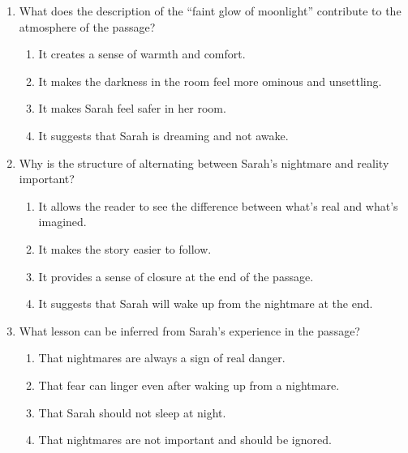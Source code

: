 \documentclass[12pt]{article}
\begin{document}
\begin{enumerate}
    \item What does the description of the “faint glow of moonlight” contribute to the atmosphere of the passage?
    \begin{enumerate}[label=\Alph*.]
        \item It creates a sense of warmth and comfort.
        \item It makes the darkness in the room feel more ominous and unsettling.
        \item It makes Sarah feel safer in her room.
        \item It suggests that Sarah is dreaming and not awake.
    \end{enumerate}
    \vspace{0.5cm}

    \item Why is the structure of alternating between Sarah’s nightmare and reality important?
    \begin{enumerate}[label=\Alph*.]
        \item It allows the reader to see the difference between what’s real and what’s imagined.
        \item It makes the story easier to follow.
        \item It provides a sense of closure at the end of the passage.
        \item It suggests that Sarah will wake up from the nightmare at the end.
    \end{enumerate}
    \vspace{0.5cm}

    \item What lesson can be inferred from Sarah’s experience in the passage?
    \begin{enumerate}[label=\Alph*.]
        \item That nightmares are always a sign of real danger.
        \item That fear can linger even after waking up from a nightmare.
        \item That Sarah should not sleep at night.
        \item That nightmares are not important and should be ignored.
    \end{enumerate}

\end{enumerate}
\end{document}
